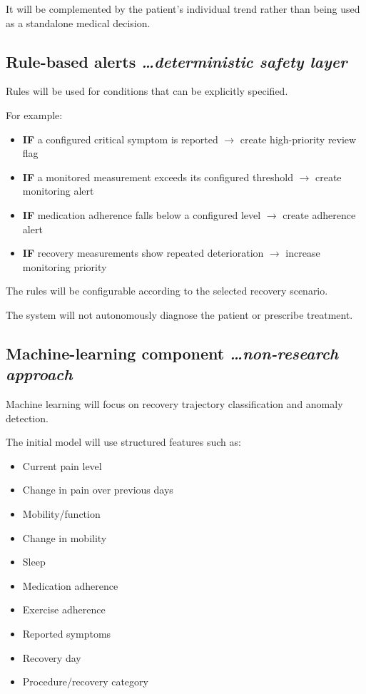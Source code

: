 \documentclass[11pt,a4paper]{article}
\newcommand{\BvrHint}[1]{%
  {\normalfont\normalsize\itshape\hfill #1}}
\begin{document}
It will be complemented by the patient's individual trend
rather than being used as a standalone medical decision.

\subsection{Rule-based alerts %
\BvrHint{\ldots deterministic safety layer}}

Rules will be used for conditions that can be explicitly
specified.

For example:
\begin{itemize}[leftmargin=0.7cm]
    \item \textbf{IF} a configured critical symptom is reported $\rightarrow$ create high-priority review flag
    \item \textbf{IF} a monitored measurement exceeds its configured threshold $\rightarrow$ create monitoring alert
    \item \textbf{IF} medication adherence falls below a configured level $\rightarrow$ create adherence alert
    \item \textbf{IF} recovery measurements show repeated deterioration $\rightarrow$ increase monitoring priority
\end{itemize}

The rules will be configurable according to the selected
recovery scenario.

The system will not autonomously diagnose the patient or
prescribe treatment.

\subsection{Machine-learning component %
\BvrHint{\ldots non-research approach}}

Machine learning will focus on recovery trajectory
classification and anomaly detection.

The initial model will use structured features such as:
\begin{itemize}[leftmargin=0.7cm]
    \item Current pain level
    \item Change in pain over previous days
    \item Mobility/function
    \item Change in mobility
    \item Sleep
    \item Medication adherence
    \item Exercise adherence
    \item Reported symptoms
    \item Recovery day
    \item Procedure/recovery category
\end{itemize}
\end{document}
